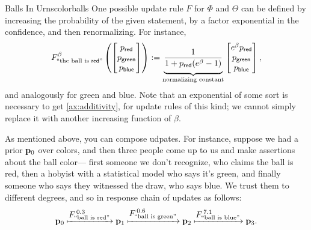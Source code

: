\documentclass{article}
\begin{document}
\begin{examplex}{Balls In Urns}{colorballs}
One possible update rule $F$ for $\Phi$ and $\Theta$ can be defined by increasing the probability of the given statement, by a factor exponential in the confidence, and then renormalizing.
For instance,
    \[
        F^{\beta}_{\text{``the ball is ${\mathsf{red}}$''}} \left(
            \begin{bmatrix} p_{\mathsf{red}} \\ p_{\mathsf{green}} \\ p_{\mathsf{blue}} \\ \end{bmatrix}
        \right) :=
            \underbrace{\vphantom{\Bigg|}
                \frac{1}{1 + p_{\mathsf{red}} (e^{\beta} - 1) }
            }_{\text{normalizing constant}}
            \begin{bmatrix}
                e^\beta  p_{\mathsf{red}} \\
                p_{\mathsf{green}}  \\
                p_{\mathsf{blue}}
            \end{bmatrix},
    \]
    and analogously for green and blue.
    Note that an exponential of some sort is necessary to get \cref{ax:additivity}, for update rules of this kind; we cannot simply replace it with another increasing function of $\beta$.

    As mentioned above, you can compose udpates. For instance, suppose we had a prior $\mathbf{p}_0$ over colors, and then three people come up to us and make assertions about the ball color---%
    first someone we don't recognize, who claims the ball is red, then a hobyist with a statistical model who says it's green, and finally someone who says they witnessed the draw, who says blue.
    We trust them to different degrees, and so in response  chain of updates as follows:
    \[
        \mathbf{p}_0
            \xmapsto{\displaystyle F^{\,0.3}_{\text{``ball is red''}}}
        \mathbf{p}_1
            \xmapsto{\displaystyle F^{\,0.6}_{\text{``ball is green''}}}
        \mathbf{p}_2
            \xmapsto{\displaystyle F^{\,7.1}_{\text{``ball is blue''}}}
        \mathbf{p}_3.
    \]


\end{examplex}
\end{document}
